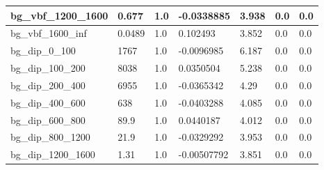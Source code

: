 \documentclass[a4paper, 10pt]{article}
\begin{document}
\begin{table}[H]
\begin{center}
\begin{tabular}{|m{23.0mm}|m{23.0mm}|m{18.0mm}|m{19.0mm}|m{19.0mm}|m{19.0mm}|m{19.0mm}|}
      \hline
      {\cellcolor{white}         bg\_vbf\_1200\_1600}& {\cellcolor{white}         0.677}& {\cellcolor{white}         1.0}& {\cellcolor{white}         -0.0338885}& {\cellcolor{white}         3.938}& {\cellcolor{green}         0.0}& {\cellcolor{green}         0.0}\\
      \hline
      {\cellcolor{white}         bg\_vbf\_1600\_inf}& {\cellcolor{white}         0.0489}& {\cellcolor{white}         1.0}& {\cellcolor{white}         0.102493}& {\cellcolor{white}         3.852}& {\cellcolor{green}         0.0}& {\cellcolor{green}         0.0}\\
      \hline
      {\cellcolor{white}         bg\_dip\_0\_100}& {\cellcolor{white}         1767}& {\cellcolor{white}         1.0}& {\cellcolor{white}         -0.0096985}& {\cellcolor{white}         6.187}& {\cellcolor{green}         0.0}& {\cellcolor{green}         0.0}\\
      \hline
      {\cellcolor{white}         bg\_dip\_100\_200}& {\cellcolor{white}         8038}& {\cellcolor{white}         1.0}& {\cellcolor{white}         0.0350504}& {\cellcolor{white}         5.238}& {\cellcolor{green}         0.0}& {\cellcolor{green}         0.0}\\
      \hline
      {\cellcolor{white}         bg\_dip\_200\_400}& {\cellcolor{white}         6955}& {\cellcolor{white}         1.0}& {\cellcolor{white}         -0.0365342}& {\cellcolor{white}         4.29}& {\cellcolor{green}         0.0}& {\cellcolor{green}         0.0}\\
      \hline
      {\cellcolor{white}         bg\_dip\_400\_600}& {\cellcolor{white}         638}& {\cellcolor{white}         1.0}& {\cellcolor{white}         -0.0403288}& {\cellcolor{white}         4.085}& {\cellcolor{green}         0.0}& {\cellcolor{green}         0.0}\\
      \hline
      {\cellcolor{white}         bg\_dip\_600\_800}& {\cellcolor{white}         89.9}& {\cellcolor{white}         1.0}& {\cellcolor{white}         0.0440187}& {\cellcolor{white}         4.012}& {\cellcolor{green}         0.0}& {\cellcolor{green}         0.0}\\
      \hline
      {\cellcolor{white}         bg\_dip\_800\_1200}& {\cellcolor{white}         21.9}& {\cellcolor{white}         1.0}& {\cellcolor{white}         -0.0329292}& {\cellcolor{white}         3.953}& {\cellcolor{green}         0.0}& {\cellcolor{green}         0.0}\\
      \hline
      {\cellcolor{white}         bg\_dip\_1200\_1600}& {\cellcolor{white}         1.31}& {\cellcolor{white}         1.0}& {\cellcolor{white}         -0.00507792}& {\cellcolor{white}         3.851}& {\cellcolor{green}         0.0}& {\cellcolor{green}         0.0}\\

\end{tabular}
\end{center}
\end{table}
\end{document}
